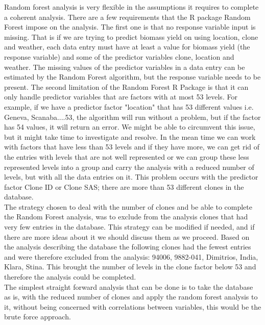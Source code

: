 \documentclass{article}\usepackage[]{graphicx}\usepackage[]{color}
\begin{document}
Random forest analysis is very flexible in the assumptions it requires to complete a coherent analysis. There are a few requirements that the R package Random Forest impose on the analysis. The first one is that no response variable input is missing. That is if we are trying to predict biomass yield on using location, clone and weather, each data entry must have at least a value for biomass yield (the response variable) and some of the predictor variables clone, location and weather. The missing values of the predictor variables in a data entry can be estimated by the Random Forest algorithm, but the response variable needs to be present.
The second limitation of the Random Forest R Package is that it can only handle predictor variables that are factors with at most 53 levels. For example, if we have a predictor factor "location" that has 53 different values i.e. Geneva, Scanaba....53, the algorithm will run without a problem, but if the factor has 54 values, it will return an error. We might be able to circumvent this issue, but it might take time to investigate and resolve. In the mean time we can work with factors that have less than 53 levels and if they have more, we can get rid of the entries with levels that are not well represented or we can group these less represented levels into a group and carry the analysis with a reduced number of levels, but with all the data entries on it. This problem occurs with the predictor factor Clone ID or Clone SAS; there are more than 53 different clones in the database.\\

The strategy chosen to deal with the number of clones and be able to complete the Random Forest analysis, was to exclude from the analysis clones that had very few entries in the database. This strategy can be modified if needed, and if there are more ideas about it we should discuss them as we proceed. Based on the analysis describing the database the following clones had the fewest entries and were therefore excluded from the analysis: 
94006, 9882-041, Dimitrios, India, Klara, Stina. 
This brought the number of levels in the clone factor below 53 and therefore the analysis could be completed.\\

The simplest straight forward analysis that can be done is to take the database as is, with the reduced number of clones and apply the random forest analysis to it, without being concerned with correlations between variables, this would be the brute force approach.
\end{document}
